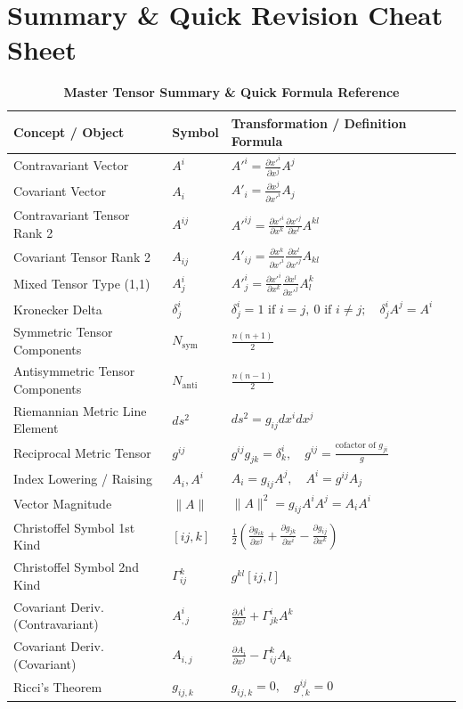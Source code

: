 \documentclass[11pt,a4paper]{article}
\begin{document}
\newpage
\section{Summary \& Quick Revision Cheat Sheet}

\begin{table}[h]
\centering
\caption{\textbf{Master Tensor Summary \& Quick Formula Reference}}
\vspace{0.3cm}
\begin{tabular}{lll}
\toprule
\textbf{Concept / Object} & \textbf{Symbol} & \textbf{Transformation / Definition Formula} \\
\midrule
Contravariant Vector & $A^i$ & $A'^i = \frac{\partial x'^i}{\partial x^j} A^j$ \\[4pt]
Covariant Vector & $A_i$ & $A'_i = \frac{\partial x^j}{\partial x'^i} A_j$ \\[4pt]
Contravariant Tensor Rank 2 & $A^{ij}$ & $A'^{ij} = \frac{\partial x'^i}{\partial x^k} \frac{\partial x'^j}{\partial x^l} A^{kl}$ \\[4pt]
Covariant Tensor Rank 2 & $A_{ij}$ & $A'_{ij} = \frac{\partial x^k}{\partial x'^i} \frac{\partial x^l}{\partial x'^j} A_{kl}$ \\[4pt]
Mixed Tensor Type (1,1) & $A^i_j$ & $A'^i_j = \frac{\partial x'^i}{\partial x^k} \frac{\partial x^l}{\partial x'^j} A^k_l$ \\[4pt]
Kronecker Delta & $\delta^i_j$ & $\delta^i_j = 1 \text{ if } i=j, \ 0 \text{ if } i \neq j; \quad \delta^i_j A^j = A^i$ \\[4pt]
Symmetric Tensor Components & $N_{\text{sym}}$ & $\frac{n(n+1)}{2}$ \\[4pt]
Antisymmetric Tensor Components & $N_{\text{anti}}$ & $\frac{n(n-1)}{2}$ \\[4pt]
Riemannian Metric Line Element & $ds^2$ & $ds^2 = g_{ij} dx^i dx^j$ \\[4pt]
Reciprocal Metric Tensor & $g^{ij}$ & $g^{ij} g_{jk} = \delta^i_k, \quad g^{ij} = \frac{\text{cofactor of } g_{ji}}{g}$ \\[4pt]
Index Lowering / Raising & $A_i, A^i$ & $A_i = g_{ij} A^j, \quad A^i = g^{ij} A_j$ \\[4pt]
Vector Magnitude & $\|A\|$ & $\|A\|^2 = g_{ij} A^i A^j = A_i A^i$ \\[4pt]
Christoffel Symbol 1st Kind & $[ij, k]$ & $\frac{1}{2} \left( \frac{\partial g_{ik}}{\partial x^j} + \frac{\partial g_{jk}}{\partial x^i} - \frac{\partial g_{ij}}{\partial x^k} \right)$ \\[4pt]
Christoffel Symbol 2nd Kind & $\Gamma^k_{ij}$ & $g^{kl} [ij, l]$ \\[4pt]
Covariant Deriv. (Contravariant) & $A^i_{,j}$ & $\frac{\partial A^i}{\partial x^j} + \Gamma^i_{jk} A^k$ \\[4pt]
Covariant Deriv. (Covariant) & $A_{i,j}$ & $\frac{\partial A_i}{\partial x^j} - \Gamma^k_{ij} A_k$ \\[4pt]
Ricci's Theorem & $g_{ij,k}$ & $g_{ij,k} = 0, \quad g^{ij}_{\, ,k} = 0$ \\
\bottomrule
\end{tabular}
\end{table}
\end{document}
